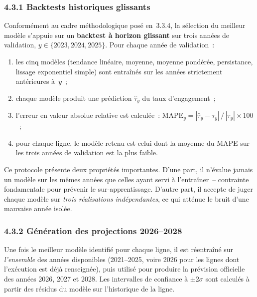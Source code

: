 \subsubsection*{4.3.1 \quad Backtests historiques glissants}

Conform\'ement au cadre m\'ethodologique pos\'e en~3.3.4, la s\'election du
meilleur mod\`ele s'appuie sur un \textbf{backtest \`a horizon glissant} sur
trois ann\'ees de validation, $y \in \{2023, 2024, 2025\}$. Pour chaque ann\'ee
de validation~:

\begin{enumerate}
    \item les cinq mod\`eles (tendance lin\'eaire, moyenne, moyenne pond\'er\'ee,
    persistance, lissage exponentiel simple) sont entra\^in\'es sur les ann\'ees
    strictement ant\'erieures \`a~$y$~;
    \item chaque mod\`ele produit une pr\'ediction $\widehat{\tau}_y$ du taux
    d'engagement~;
    \item l'erreur en valeur absolue relative est calcul\'ee~:
    $\text{MAPE}_y = |\widehat{\tau}_y - \tau_y|\,/\,|\tau_y| \times 100$~;
    \item pour chaque ligne, le mod\`ele retenu est celui dont la moyenne du
    MAPE sur les trois ann\'ees de validation est la plus faible.
\end{enumerate}

Ce protocole pr\'esente deux propri\'et\'es importantes. D'une part, il
n'\'evalue jamais un mod\`ele sur les m\^emes ann\'ees que celles ayant servi
\`a l'entra\^iner~-- contrainte fondamentale pour pr\'evenir le sur-apprentissage.
D'autre part, il accepte de juger chaque mod\`ele sur \emph{trois r\'ealisations
ind\'ependantes}, ce qui att\'enue le bruit d'une mauvaise ann\'ee isol\'ee.

\subsubsection*{4.3.2 \quad G\'en\'eration des projections 2026--2028}

Une fois le meilleur mod\`ele identifi\'e pour chaque ligne, il est r\'eentra\^in\'e
sur \emph{l'ensemble} des ann\'ees disponibles (2021--2025, voire 2026 pour les
lignes dont l'ex\'ecution est d\'ej\`a renseign\'ee), puis utilis\'e pour
produire la pr\'evision officielle des ann\'ees 2026, 2027 et 2028. Les
intervalles de confiance \`a $\pm 2\sigma$ sont calcul\'es \`a partir des
r\'esidus du mod\`ele sur l'historique de la ligne.

